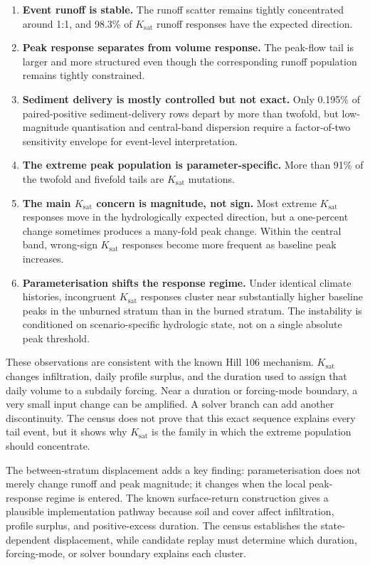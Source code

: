 \documentclass[11pt]{article}
\newcommand{\Ksat}{\ensuremath{K_{\mathrm{sat}}}}
\begin{document}
\begin{enumerate}
  \item \textbf{Event runoff is stable.} The runoff scatter remains tightly
    concentrated around 1:1, and 98.3\% of \Ksat{} runoff responses have the
    expected direction.
  \item \textbf{Peak response separates from volume response.} The peak-flow
    tail is larger and more structured even though the corresponding runoff
    population remains tightly constrained.
  \item \textbf{Sediment delivery is mostly controlled but not exact.} Only
    0.195\% of paired-positive sediment-delivery rows depart by more than
    twofold, but low-magnitude quantisation and central-band dispersion require
    a factor-of-two sensitivity envelope for event-level interpretation.
  \item \textbf{The extreme peak population is parameter-specific.} More than
    91\% of the twofold and fivefold tails are \Ksat{} mutations.
  \item \textbf{The main \Ksat{} concern is magnitude, not sign.} Most extreme
    \Ksat{} responses move in the hydrologically expected direction, but a
    one-percent change sometimes produces a many-fold peak change. Within the
    central band, wrong-sign \Ksat{} responses become more frequent as baseline
    peak increases.
  \item \textbf{Parameterisation shifts the response regime.} Under identical
    climate histories, incongruent \Ksat{} responses cluster near substantially
    higher baseline peaks in the unburned stratum than in the burned stratum.
    The instability is conditioned on scenario-specific hydrologic state, not
    on a single absolute peak threshold.
\end{enumerate}

These observations are consistent with the known Hill 106 mechanism. \Ksat{}
changes infiltration, daily profile surplus, and the duration used to assign
that daily volume to a subdaily forcing. Near a duration or forcing-mode
boundary, a very small input change can be amplified. A solver branch can add
another discontinuity. The census does not prove that this exact sequence
explains every tail event, but it shows why \Ksat{} is the family in which the
extreme population should concentrate.

The between-stratum displacement adds a key finding: parameterisation does not
merely change runoff and peak magnitude; it changes when the local peak-response
regime is entered. The known surface-return construction gives a plausible
implementation pathway because soil and cover affect infiltration, profile
surplus, and positive-excess duration. The census establishes the
state-dependent displacement, while candidate replay must determine which
duration, forcing-mode, or solver boundary explains each cluster.
\end{document}
